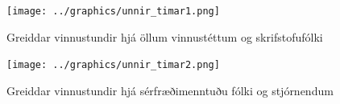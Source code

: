 \documentclass[12pt, git, draft]{rureport}
\begin{document}
\begin{figure}
	\centering 
	\texttt{[image: ../graphics/unnir\_timar1.png]}
	\caption{Greiddar vinnustundir hjá öllum vinnustéttum og skrifstofufólki \label{fig:unnirtimar1}}
\end{figure}

\begin{figure}
	\centering 
	\texttt{[image: ../graphics/unnir\_timar2.png]}
	\caption{Greiddar vinnustundir hjá sérfræðimenntuðu fólki og stjórnendum \label{fig:unnirtimar2}}
\end{figure}

%
\clearpage
\printbibliography
\end{document}
